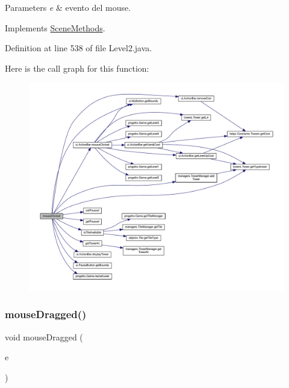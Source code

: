 \begin{DoxyParams}{Parameters}
{\em e} & evento del mouse. \\
\hline
\end{DoxyParams}


Implements \hyperlink{interfacescenes_1_1_scene_methods_a45d56bd84238e8b56589dfc732e2b2cf}{Scene\+Methods}.



Definition at line 538 of file Level2.\+java.

Here is the call graph for this function\+:
\nopagebreak
\begin{figure}[H]
\begin{center}
\leavevmode
\includegraphics[width=350pt]{classscenes_1_1_level2_a45d56bd84238e8b56589dfc732e2b2cf_cgraph}
\end{center}
\end{figure}
\mbox{\label{classscenes_1_1_level2_adbfc0588c017133c9b7070474402b72f}} 
\subsubsection{\texorpdfstring{mouse\+Dragged()}{mouseDragged()}}
{\footnotesize\ttfamily void mouse\+Dragged (\begin{DoxyParamCaption}\item[{Mouse\+Event}]{e }\end{DoxyParamCaption})}



